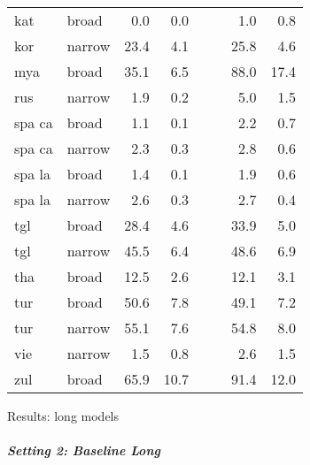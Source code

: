 {\begin{tabularx}{\textwidth}{|l|X||r|r||X|X||r|r|}
kat       & broad         & 0.0    & 0.0    &              &              & 1.0    & 0.8    \\
kor       & narrow        & 23.4   & 4.1    &              &              & 25.8   & 4.6    \\
mya       & broad         & 35.1   & 6.5    &              &              & 88.0   & 17.4   \\
rus       & narrow        & 1.9    & 0.2    &              &              & 5.0    & 1.5    \\
spa ca    & broad         & 1.1    & 0.1    &              &              & 2.2    & 0.7    \\
spa ca    & narrow        & 2.3    & 0.3    &              &              & 2.8    & 0.6    \\
spa la    & broad         & 1.4    & 0.1    &              &              & 1.9    & 0.6    \\
spa la    & narrow        & 2.6    & 0.3    &              &              & 2.7    & 0.4    \\
tgl       & broad         & 28.4   & 4.6    &              &              & 33.9   & 5.0    \\
tgl       & narrow        & 45.5   & 6.4    &              &              & 48.6   & 6.9    \\
tha       & broad         & 12.5   & 2.6    &              &              & 12.1   & 3.1    \\
tur       & broad         & 50.6   & 7.8    &              &              & 49.1   & 7.2    \\
tur       & narrow        & 55.1   & 7.6    &              &              & 54.8   & 8.0    \\
vie       & narrow        & 1.5    & 0.8    &              &              & 2.6    & 1.5    \\
zul       & broad         & 65.9   & 10.7   &              &              & 91.4   & 12.0   \\ \hline
\end{tabularx}
}{Results: long models}

\subparagraph{Setting 2: Baseline Long}

